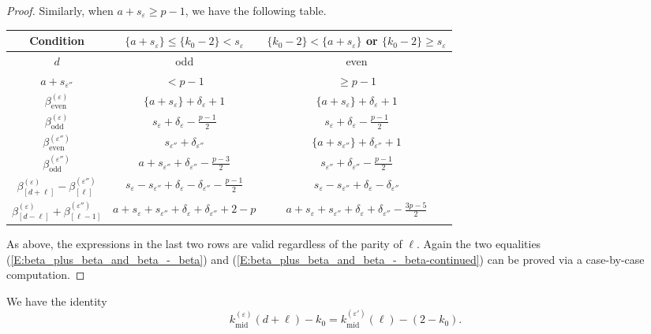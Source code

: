 \begin{proof}
    Similarly, when $a + s_\varepsilon \geq p-1$, we have the following table.
    \begin{center}
    \begin{tabular}{|c|c|c|}
    \hline
    Condition & $\{a+s_\varepsilon\}\leq  \{k_0-2\} < s_\varepsilon$ &$\{k_0-2\}< \{a+s_\varepsilon\} $ or $\{k_0-2\} \geq s_\varepsilon$ \\
    \hline
    $d$ &  odd & even \\
    \hline
    $a+ s_{\varepsilon''}$  & $< p-1$&  $\geq p-1$ \\
    \hline
    $\beta^{(\varepsilon)}_{\mathrm{even}}$ & $\{a+s_\varepsilon\} + \delta_\varepsilon+1$& $\{a+s_\varepsilon\} + \delta_\varepsilon+1$ \\
    \hline
    $\beta^{(\varepsilon)}_{\mathrm{odd}}$ & $s_\varepsilon + \delta_\varepsilon - \frac{p-1}2$ & $s_\varepsilon + \delta_\varepsilon - \frac{p-1}2$ \\
    \hline
    $\beta^{(\varepsilon'')}_{\mathrm{even}}$ & $s_{\varepsilon''} + \delta_{\varepsilon''}$ & $\{a+s_{\varepsilon''}\}  + \delta_{\varepsilon''}+1$ \\
    \hline
    $\beta^{(\varepsilon'')}_{\mathrm{odd}}$&$a+s_{\varepsilon''} + \delta_{\varepsilon''} - \frac{p-3}2$ & $s_{\varepsilon''} + \delta_{\varepsilon''} -\frac{p-1}2$ \\
    \hline
    $\beta_{[d+\ell]}^{(\varepsilon)} - \beta_{[\ell]}^{(\varepsilon'')}$ & $s_\varepsilon -s_{\varepsilon''} +  \delta_\varepsilon - \delta_{\varepsilon''} -\frac{p-1}2$ & $s_\varepsilon - s_{\varepsilon''} + \delta_{\varepsilon } - \delta_{\varepsilon''}$ \\
    \hline
    $\beta_{[d-\ell]}^{(\varepsilon)} + \beta_{[\ell-1]}^{(\varepsilon'')}$  & $a+  s_\varepsilon + s_{\varepsilon''} + \delta_\varepsilon + \delta_{\varepsilon ''} +2-p$ & $a+  s_\varepsilon + s_{\varepsilon''} + \delta_\varepsilon + \delta_{\varepsilon ''} -\frac{3p-5}2$ \\
    \hline
    \end{tabular}
    \end{center}
    As above, the expressions in the last two rows are valid regardless of the parity of $\ell$.
    Again the two equalities (\ref{E:beta_plus_beta_and_beta_-_beta}) and (\ref{E:beta_plus_beta_and_beta_-_beta-continued}) can be proved via a case-by-case computation.
\end{proof}

\begin{lemma}
    \label{L:three_elementary_identities_part1}
    We have the identity
    $$k_{\mathrm{mid}}^{(\varepsilon)} (d+\ell) -k_0 = k_{{\mathrm{mid}}}^{(\varepsilon')}(\ell) - (2-k_0).$$
\end{lemma}

